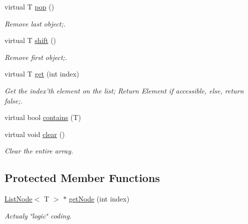 \begin{DoxyCompactItemize}
virtual T \hyperlink{classLinkedList_a00a70f924d76dcbfa3b05503caad40e6}{pop} ()
\begin{DoxyCompactList}\small\item\em Remove last object;. \end{DoxyCompactList}\item 
virtual T \hyperlink{classLinkedList_aaf7239844a9d745b6dd11249ff4990c8}{shift} ()
\begin{DoxyCompactList}\small\item\em Remove first object;. \end{DoxyCompactList}\item 
virtual T \hyperlink{classLinkedList_a25079ed9b408efad63a1522c818d8705}{get} (int index)
\begin{DoxyCompactList}\small\item\em Get the index'th element on the list; Return Element if accessible, else, return false;. \end{DoxyCompactList}\item 
virtual bool \hyperlink{classLinkedList_af1de9b03ff401cae0a842680b77d32c2}{contains} (T)
\begin{DoxyCompactList}\small\item\em 
\begin{DoxyItemize}
\item 
\end{DoxyItemize}\end{DoxyCompactList}\item 
virtual void \hyperlink{classLinkedList_a50c26292740c964ac7bef0e072868be1}{clear} ()
\begin{DoxyCompactList}\small\item\em Clear the entire array. \end{DoxyCompactList}\end{DoxyCompactItemize}
\subsection*{Protected Member Functions}
\begin{DoxyCompactItemize}
\item 
\hyperlink{structListNode}{List\-Node}$<$ T $>$ $\ast$ \hyperlink{classLinkedList_a8ac5df15e0aba36cb279bf2ce0d6b72e}{get\-Node} (int index)
\begin{DoxyCompactList}\small\item\em Actualy \char`\"{}logic\char`\"{} coding. \end{DoxyCompactList}\end{DoxyCompactItemize}

